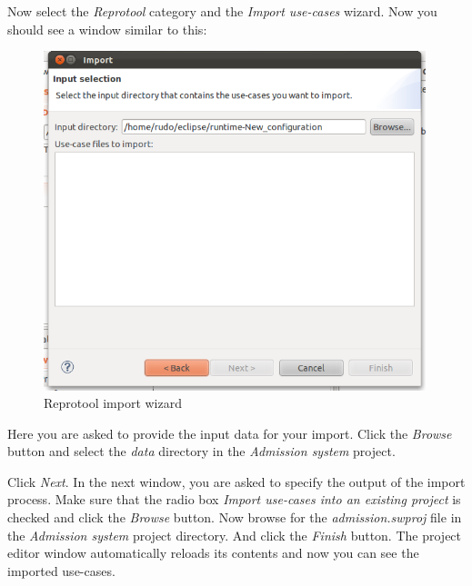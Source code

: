 Now select the \emph{Reprotool} category and the \emph{Import use-cases} wizard. Now you should see a window similar to this:

\newpage

\begin{figure}[ht]
  \centering
  \includegraphics[height=280pt]{images/reprotoolImportWizard}
  \caption{Reprotool import wizard}
  \label{fig:reprotoolImportWizard}
\end{figure}

Here you are asked to provide the input data for your import. Click the \emph{Browse} button and select the \emph{data} directory
in the \emph{Admission system} project.

Click \emph{Next}. In the next window, you are asked to specify the output of the import process. Make sure that the radio box
\emph{Import use-cases into an existing project} is checked and click the \emph{Browse} button. Now browse for the
\emph{admission.swproj} file in the \emph{Admission system} project directory. And click the \emph{Finish} button. The project
editor window automatically reloads its contents and now you can see the imported use-cases.
